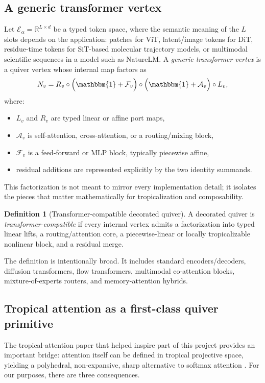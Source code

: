 \documentclass[11pt]{article}
\theoremstyle{definition}
\newtheorem{definition}{Definition}[section]
\theoremstyle{plain}
\theoremstyle{remark}
\newcommand{\R}{\mathbb{R}}
\newcommand{\Id}{\mathbbm{1}}
\newcommand{\mc}[1]{\mathcal{#1}}
\newcommand{\Emb}{\mc{E}}
\begin{document}
\subsection{A generic transformer vertex}
\label{sec:generic-transformer}

Let $\Emb_\alpha=\R^{L\times d}$ be a typed token space, where the semantic meaning of the $L$ slots depends on the application:
patches for ViT, latent/image tokens for DiT, residue-time tokens for SiT-based molecular trajectory models, or multimodal scientific sequences in a model such as NatureLM.
A \emph{generic transformer vertex} is a quiver vertex whose internal map factors as
\[
N_v
=
R_v \circ \Bigl(\Id + \mc{F}_v \Bigr)\circ \Bigl(\Id + \mc{A}_v\Bigr)\circ L_v,
\]
where:
\begin{itemize}[leftmargin=2em]
\item $L_v$ and $R_v$ are typed linear or affine port maps,
\item $\mc{A}_v$ is self-attention, cross-attention, or a routing/mixing block,
\item $\mc{F}_v$ is a feed-forward or MLP block, typically piecewise affine,
\item residual additions are represented explicitly by the two identity summands.
\end{itemize}
This factorization is not meant to mirror every implementation detail;
it isolates the pieces that matter mathematically for tropicalization and composability.

\begin{definition}[Transformer-compatible decorated quiver]
A decorated quiver is \emph{transformer-compatible} if every internal vertex admits a factorization into typed linear lifts, a routing/attention core, a piecewise-linear or locally tropicalizable nonlinear block, and a residual merge.
\end{definition}

The definition is intentionally broad.
It includes standard encoders/decoders, diffusion transformers, flow transformers, multimodal co-attention blocks, mixture-of-experts routers, and memory-attention hybrids.

\subsection{Tropical attention as a first-class quiver primitive}
\label{sec:tropical-attention}

The tropical-attention paper that helped inspire part of this project provides an important bridge:
attention itself can be defined in tropical projective space, yielding a polyhedral, non-expansive, sharp alternative to softmax attention \cite{HashemiPasqueTeskaYoshida2025}.
For our purposes, there are three consequences.
\end{document}
